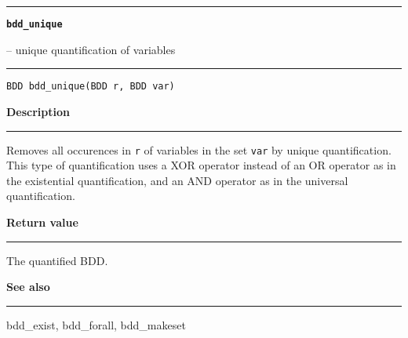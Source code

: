 \begin{minipage}{\textwidth}

\noindent\begin{minipage}{\textwidth}
\rule{\textwidth}{0.5mm}
{\tt\bf bdd\_unique }
\--- unique quantification of variables  \hspace{\fill}
\\\rule[1.5ex]{\textwidth}{0.5mm}
\end{minipage}

\noindent\begin{verbatim}
BDD bdd_unique(BDD r, BDD var) 
\end{verbatim}

\vspace{\parsep}\noindent
{\bf Description}\\\rule[1.5ex]{\textwidth}{0.2mm}\vspace{-1.5ex}\setlength{\parindent}{1em}
Removes all occurences in {\tt r} of variables in the set
           {\tt var} by unique quantification. This type of quantification
	   uses a XOR operator instead of an OR operator as in the
	   existential quantification, and an AND operator as in the
	   universal quantification. 

\setlength{\parindent}{0em}\vspace{\parsep}\vspace{\baselineskip}\noindent
{\bf Return value}\\\rule[1.5ex]{\textwidth}{0.2mm}\vspace{-1.5ex}
The quantified BDD. 

\vspace{\parsep}\vspace{\baselineskip}\noindent
{\bf See also}\\\rule[1.5ex]{\textwidth}{0.2mm}\vspace{-1.5ex}
bdd\_exist, bdd\_forall, bdd\_makeset 
\end{minipage}
\vspace{8ex}
